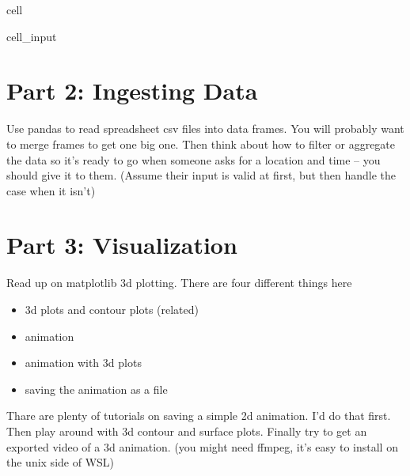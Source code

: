 \documentclass[letterpaper,10pt,english]{jupyterBook}
\begin{document}
\begin{sphinxuseclass}{cell}\begin{sphinxVerbatimInput}

\begin{sphinxuseclass}{cell_input}
\begin{sphinxVerbatim}[commandchars=\\\{\}]
\end{sphinxVerbatim}

\end{sphinxuseclass}\end{sphinxVerbatimInput}

\end{sphinxuseclass}

\section{Part 2: Ingesting Data}
\label{\detokenize{lessons/Hobo_Student:part-2-ingesting-data}}
\sphinxAtStartPar
Use pandas to read spreadsheet csv files into data frames. You will probably want to merge frames to get one big one. Then think about how to filter or aggregate the data so it’s ready to go when someone asks for a location and time – you should give it to them. (Assume their input is valid at first, but then handle the case when it isn’t)


\section{Part 3: Visualization}
\label{\detokenize{lessons/Hobo_Student:part-3-visualization}}
\sphinxAtStartPar
Read up on matplotlib 3d plotting. There are four different things here
\begin{itemize}
\item {} 
\sphinxAtStartPar
3d plots and contour plots (related)

\item {} 
\sphinxAtStartPar
animation

\item {} 
\sphinxAtStartPar
animation with 3d plots

\item {} 
\sphinxAtStartPar
saving the animation as a file

\end{itemize}

\sphinxAtStartPar
Thare are plenty of tutorials on saving a simple 2d animation. I’d do that first. Then play around with 3d contour and surface plots. Finally try to get an exported video of a 3d animation. (you might need ffmpeg, it’s easy to install on the unix side of WSL)
\end{document}
